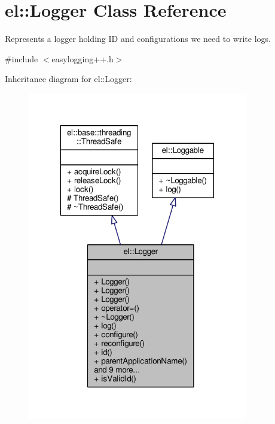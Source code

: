 \hypertarget{classel_1_1Logger}{}\section{el\+:\+:Logger Class Reference}
\label{classel_1_1Logger}


Represents a logger holding ID and configurations we need to write logs.  




{\ttfamily \#include $<$easylogging++.\+h$>$}



Inheritance diagram for el\+:\+:Logger\+:
\nopagebreak
\begin{figure}[H]
\begin{center}
\leavevmode
\includegraphics[width=272pt]{d7/d75/classel_1_1Logger__inherit__graph}
\end{center}
\end{figure}


